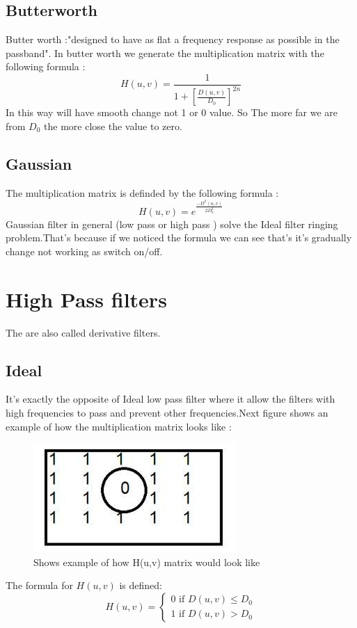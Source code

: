\documentclass{article}
\begin{document}
\begin{multicols*}{2}
\subsection{Butterworth}
Butter worth :"designed to have as flat a frequency response as possible in the passband"\cite{3}.
In butter worth we generate the multiplication matrix with the following formula :
\[H(u,v)=\frac{1}{1+[\frac{D(u,v)}{D_0}]^{2n}}\]
In this way will have smooth change not 1 or 0 value. So The more far we are from \(D_0\) the more close the value to zero.
\subsection{Gaussian}
The multiplication matrix is definded by the following formula : 
\[ H(u,v) = e^{\frac{-D^2(u,v)}{2D_0^2}} \]	
Gaussian filter in general (low pass or high pass ) solve the Ideal filter ringing problem.That's because if we noticed the formula we can see that's it's gradually change not working as switch on/off.
\section{High Pass filters}
The are also called derivative filters.\cite{1}
\subsection{Ideal}
It's exactly the opposite of Ideal low pass filter where it allow the filters with high frequencies to pass and prevent other frequencies.Next figure shows an example of how the multiplication matrix looks like :
\begin{figure}[H]
\includegraphics[scale=0.5]{ihpfexample.png}
\caption{Shows example of how H(u,v) matrix would look like}
\end{figure}
The formula for \(H(u,v)\) is defined:
  \[
  H(u,v)=\left\{
  \begin{array}{ll}
  0 \text{ if } D(u,v)\leq D_0\\
  1 \text{ if } D(u,v)> D_0
  \end{array}
  \right.
  \]

\end{multicols*}
\end{document}
